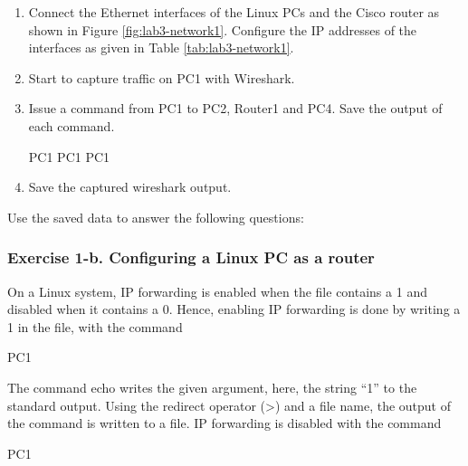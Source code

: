 \begin{enumerate}
	\item  Connect the Ethernet interfaces of the Linux PCs and the Cisco router as shown in Figure \ref{fig:lab3-network1}. Configure the IP addresses of the interfaces as given in Table \ref{tab:lab3-network1}.
	\item Start to capture traffic on PC1 with Wireshark.
	\item Issue a  command from PC1 to PC2, Router1 and PC4. Save the output of each  command.
		\begin{cmdblock}
PC1%
PC1%
PC1%
		\end{cmdblock}
	\item Save the captured wireshark output.
\end{enumerate}

Use the saved data to answer the following questions:

\begin{questions}
\end{questions}
	
\subsubsection*{Exercise 1-b. Configuring a Linux PC as a router}

On a Linux system, IP forwarding is enabled when the file  contains a 1 and disabled when it contains a 0. Hence, enabling IP forwarding is done by writing a 1 in the file, with the command
\begin{cmdblock}
	PC1%
\end{cmdblock}

The command echo writes the given argument, here, the string ``1'' to the standard output. Using the redirect operator (\textgreater ) and a file name, the output of the command is written to a file. IP forwarding is disabled with the command

\begin{cmdblock}
	PC1%
\end{cmdblock}

